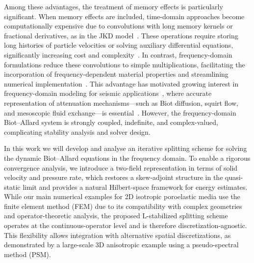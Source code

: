 \documentclass[pdflatex,sn-mathphys-num]{sn-jnl}
\theoremstyle{thmstyleone}%
\theoremstyle{thmstyletwo}%
\theoremstyle{thmstylethree}%
\theoremstyle{definition}
\begin{document}
	Among these advantages, the treatment of memory effects is particularly significant. When memory effects are included, time-domain approaches become computationally expensive due to convolutions with long memory kernels or fractional derivatives, as in the JKD model~\cite{Johnson1987,Lu2004}. These operations require storing long histories of particle velocities or solving auxiliary differential equations, significantly increasing cost and complexity~\cite{stokkeEnumath,stokke2024a, stokke_convergence_2025}. In contrast, frequency-domain formulations reduce these convolutions to simple multiplications, facilitating the incorporation of frequency-dependent material properties and streamlining numerical implementation~\cite{Kanaun2018,Huang2024,Carcamo2024}. This advantage has motivated growing interest in frequency-domain modeling for seismic applications~\cite{LiuGreenhalgh2019, Zhan2021, Kanaun2018, Huang2024, yang2021frequency}, where accurate representation of attenuation mechanisms—such as Biot diffusion, squirt flow, and mesoscopic fluid exchange—is essential~\cite{Carcione1998,pride2004}. However, the frequency-domain Biot–Allard system is strongly coupled, indefinite, and complex-valued, complicating stability analysis and solver design.
	
	In this work we will develop and analyse an iterative splitting scheme for solving the dynamic Biot--Allard equations in the frequency domain. To enable a rigorous convergence analysis, we introduce a two-field representation in terms of solid velocity and pressure rate, which restores a skew-adjoint structure in the quasi-static limit and provides a natural Hilbert-space framework for energy estimates. While our main numerical examples for 2D isotropic poroelastic media use the finite element method (FEM) due to its compatibility with complex geometries and operator-theoretic analysis, the proposed L-stabilized splitting scheme operates at the continuous-operator level and is therefore discretization-agnostic. This flexibility allows integration with alternative spatial discretizations, as demonstrated by a large-scale 3D anisotropic example using a pseudo-spectral method (PSM).
	
	
	
\end{document}
